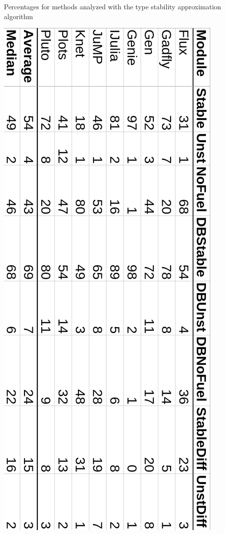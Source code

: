\begin{table}%
\caption{Percentages for methods analyzed with the type stability
  approximation algorithm}%
  \includegraphics[width=.7\textwidth]
  {figs/sts-eval/table-eval-percent-numbers-rot.png}
\end{table}
